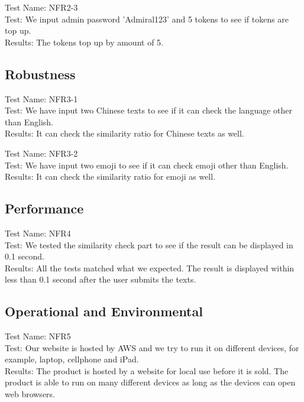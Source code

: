 \documentclass[12pt, titlepage]{article}
\begin{document}
    Test Name: NFR2-3\\
	
	Test: We input admin password 'Admiral123' and 5 tokens to see if tokens are top up. \\
	
    Results: The tokens top up by amount of 5. 
    
    \subsection{Robustness}
    
	Test Name: NFR3-1\\
	
	Test: We have input two Chinese texts to see if it can check the language other than English.\\
	
    Results: It can check the similarity ratio for Chinese texts as well.
    
    Test Name: NFR3-2\\
	
	Test: We have input two emoji to see if it can check emoji other than English.\\
	
    Results: It can check the similarity ratio for emoji as well.

	\subsection{Performance}
	
	Test Name: NFR4\\
	
	Test: We tested the similarity check part to see if the result can be displayed in 0.1 second.  \\
	
    Results: All the tests matched what we expected. The result is displayed within less than 0.1 second after the user submits the texts. 
	
	\subsection{Operational and Environmental}
	Test Name: NFR5\\
	
	Test: Our website is hosted by AWS and we try to run it on different devices, for example, laptop, cellphone and iPad.\\
	
    Results: The product is hosted by a website for local use before it is sold. The product is able to run on many different devices as long as the devices can open web browsers.
    
\end{document}
